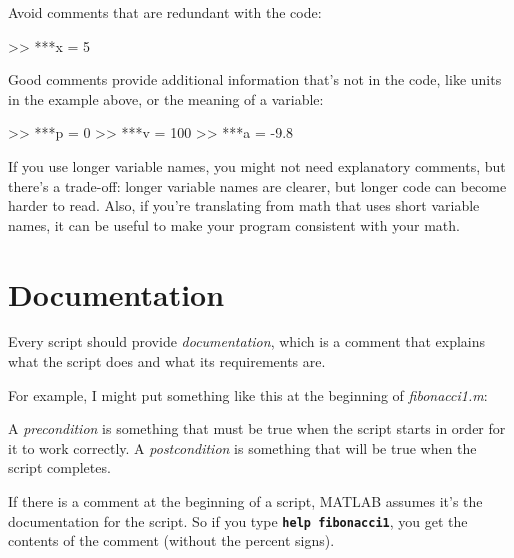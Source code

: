 
Avoid comments that are redundant with the code:

\begin{code}
>> ***x = 5        %
\end{code}

Good comments provide additional information that's not in the
code, like units in the example above, or the meaning of a variable:

\begin{code}
>> ***p = 0         %
>> ***v = 100       %
>> ***a = -9.8      %
\end{code}

If you use longer variable names, you might not need explanatory
comments, but there's a trade-off: longer variable names are clearer, but longer code can become harder
to read.
Also, if you're translating from math
that uses short variable names, it can be useful to make your
program consistent with your math.


\section{Documentation}

Every script should provide \emph{documentation}, which is a comment
that explains what the script does and what its requirements are.

For example, I might put something like this at the beginning of {\em fibonacci1.m}:


\begin{code}
\end{code}

A \emph{precondition} is something that must be true when the script
starts in order for it to work correctly.  A \emph{postcondition}
is something that will be true when the script completes.


If there is a comment at the beginning of a script, MATLAB assumes
it's the documentation for the script. So if you type \textbf{\lstinline{help
fibonacci1}}, you get the contents of the comment (without the percent
signs).

